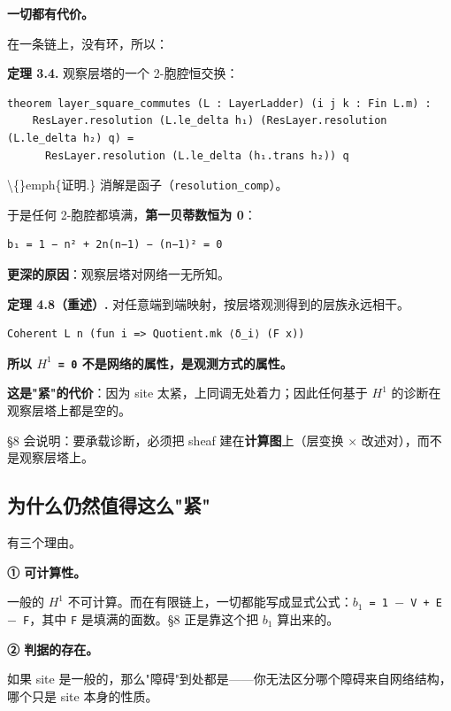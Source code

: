 \documentclass[11pt,a4paper]{ctexart}
\begin{document}
\textbf{一切都有代价。}

在一条链上，没有环，所以：

\textbf{定理 3.4.} 观察层塔的一个 2-胞腔恒交换：

\begin{lstlisting}
theorem layer_square_commutes (L : LayerLadder) (i j k : Fin L.m) :
    ResLayer.resolution (L.le_delta h₁) (ResLayer.resolution (L.le_delta h₂) q) =
      ResLayer.resolution (L.le_delta (h₁.trans h₂)) q
\end{lstlisting}

\textbackslash\{\}emph\{证明.\} 消解是函子（\texttt{resolution\_comp}）。

于是任何 2-胞腔都填满，\textbf{第一贝蒂数恒为 0}：

\begin{lstlisting}
b₁ = 1 − n² + 2n(n−1) − (n−1)² = 0
\end{lstlisting}

\textbf{更深的原因}：观察层塔对网络一无所知。

\textbf{定理 4.8（重述）.} 对任意端到端映射，按层塔观测得到的层族永远相干。

\begin{lstlisting}
Coherent L n (fun i => Quotient.mk ⟨δ_i⟩ (F x))
\end{lstlisting}

\textbf{所以 \texttt{\ensuremath{H^{1}} = 0} 不是网络的属性，是观测方式的属性。}

\textbf{这是"紧"的代价}：因为 site 太紧，上同调无处着力；因此任何基于 \texttt{\ensuremath{H^{1}}} 的诊断在观察层塔上都是空的。

§8 会说明：要承载诊断，必须把 sheaf 建在\textbf{计算图}上（层变换 \ensuremath{\times} 改述对），而不是观察层塔上。

\subsection{为什么仍然值得这么"紧"}

有三个理由。

\textbf{① 可计算性。}

一般的 \texttt{\ensuremath{H^{1}}} 不可计算。而在有限链上，一切都能写成显式公式：\texttt{\ensuremath{b_{1}} = 1 \ensuremath{-} V + E \ensuremath{-} F}，其中 \texttt{F} 是填满的面数。§8 正是靠这个把 \texttt{\ensuremath{b_{1}}} 算出来的。

\textbf{② 判据的存在。}

如果 site 是一般的，那么"障碍"到处都是——你无法区分哪个障碍来自网络结构，哪个只是 site 本身的性质。
\end{document}
